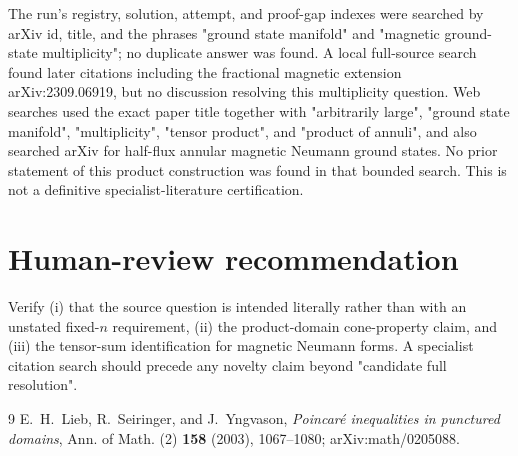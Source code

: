 \documentclass[11pt]{article}
\begin{document}
The run's registry, solution, attempt, and proof-gap indexes were searched by
arXiv id, title, and the phrases "ground state manifold" and "magnetic
ground-state multiplicity"; no duplicate answer was found.  A local
full-source search found later citations including the fractional magnetic
extension arXiv:2309.06919, but no discussion resolving this multiplicity
question.  Web searches used the exact paper title together with
"arbitrarily large", "ground state manifold", "multiplicity",
"tensor product", and "product of annuli", and also searched arXiv for
half-flux annular magnetic Neumann ground states.  No prior statement of this
product construction was found in that bounded search.  This is not a
definitive specialist-literature certification.

\section{Human-review recommendation}

Verify (i) that the source question is intended literally rather than with an
unstated fixed-\(n\) requirement, (ii) the product-domain cone-property claim,
and (iii) the tensor-sum identification for magnetic Neumann forms.  A
specialist citation search should precede any novelty claim beyond
"candidate full resolution".

\begin{thebibliography}{9}
E.\ H.\ Lieb, R.\ Seiringer, and J.\ Yngvason,
\emph{Poincar\'e inequalities in punctured domains},
Ann. of Math. (2) \textbf{158} (2003), 1067--1080;
arXiv:math/0205088.
\end{thebibliography}
\end{document}
